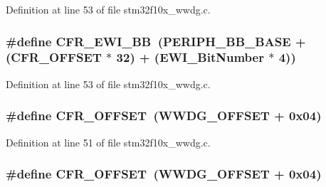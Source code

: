Definition at line 53 of file stm32f10x\+\_\+wwdg.\+c.

\subsubsection[{\texorpdfstring{C\+F\+R\+\_\+\+E\+W\+I\+\_\+\+BB}{CFR_EWI_BB}}]{\setlength{\rightskip}{0pt plus 5cm}\#define C\+F\+R\+\_\+\+E\+W\+I\+\_\+\+BB~({\bf P\+E\+R\+I\+P\+H\+\_\+\+B\+B\+\_\+\+B\+A\+SE} + ({\bf C\+F\+R\+\_\+\+O\+F\+F\+S\+ET} $\ast$ 32) + ({\bf E\+W\+I\+\_\+\+Bit\+Number} $\ast$ 4))}\hypertarget{group___w_w_d_g___private___defines_gaa48804210cea547f0e0f4ca49c44fc94}{}\label{group___w_w_d_g___private___defines_gaa48804210cea547f0e0f4ca49c44fc94}


Definition at line 53 of file stm32f10x\+\_\+wwdg.\+c.

\subsubsection[{\texorpdfstring{C\+F\+R\+\_\+\+O\+F\+F\+S\+ET}{CFR_OFFSET}}]{\setlength{\rightskip}{0pt plus 5cm}\#define C\+F\+R\+\_\+\+O\+F\+F\+S\+ET~({\bf W\+W\+D\+G\+\_\+\+O\+F\+F\+S\+ET} + 0x04)}\hypertarget{group___w_w_d_g___private___defines_ga3e0f9d9f7f69a6d133bba721e25aca4a}{}\label{group___w_w_d_g___private___defines_ga3e0f9d9f7f69a6d133bba721e25aca4a}


Definition at line 51 of file stm32f10x\+\_\+wwdg.\+c.

\subsubsection[{\texorpdfstring{C\+F\+R\+\_\+\+O\+F\+F\+S\+ET}{CFR_OFFSET}}]{\setlength{\rightskip}{0pt plus 5cm}\#define C\+F\+R\+\_\+\+O\+F\+F\+S\+ET~({\bf W\+W\+D\+G\+\_\+\+O\+F\+F\+S\+ET} + 0x04)}\hypertarget{group___w_w_d_g___private___defines_ga3e0f9d9f7f69a6d133bba721e25aca4a}{}\label{group___w_w_d_g___private___defines_ga3e0f9d9f7f69a6d133bba721e25aca4a}


